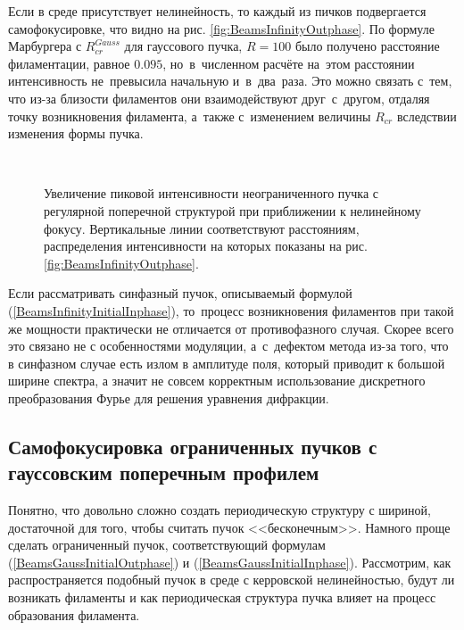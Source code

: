 
Если в среде присутствует нелинейность, то каждый из пичков подвергается самофокусировке, что видно на рис. \ref{fig:BeamsInfinityOutphase}.
По формуле Марбургера с $R_{cr}^{Gauss}$ для гауссового пучка, $R = 100$ было получено расстояние филаментации,
равное $0.095$, но~в~численном расчёте на~этом расстоянии интенсивность не~превысила начальную и~в~два~раза. 
Это можно связать с~тем, что из-за близости филаментов они взаимодействуют друг~с~другом, отдаляя точку возникновения филамента,
а~также с~изменением величины $R_{cr}$ вследствии изменения формы пучка.


\begin{figure}[H]
    \begin{center}
        \begin{minipage}{\minipagewidthtwo}
        \end{minipage}
       \\[1ex]
        \caption{Увеличение пиковой интенсивности неограниченного пучка с регулярной поперечной структурой при приближении к нелинейному фокусу.
                 Вертикальные линии соответствуют расстояниям, распределения интенсивности на которых показаны на рис.  \ref{fig:BeamsInfinityOutphase}.}
        \label{fig:BeamsInfinityIz}
    \end{center}
\end{figure}


Если рассматривать синфазный пучок, описываемый формулой (\ref{BeamsInfinityInitialInphase}), то~процесс возникновения
филаментов при такой же мощности практически не отличается от противофазного случая.
Скорее всего это связано не с особенностями модуляции, а~с~дефектом метода из-за того,
что в синфазном случае есть излом в амплитуде поля, который приводит к большой ширине спектра,
а значит не совсем корректным использование дискретного преобразования Фурье для решения уравнения дифракции.


\subsection{Самофокусировка ограниченных пучков с гауссовским поперечным профилем}

Понятно, что довольно сложно создать периодическую структуру с шириной, достаточной для того, чтобы считать пучок <<бесконечным>>.
Намного проще сделать ограниченный пучок, соответствующий формулам (\ref{BeamsGaussInitialOutphase}) и (\ref{BeamsGaussInitialInphase}).
Рассмотрим, как распространяется подобный пучок в среде с керровской нелинейностью,
будут ли возникать филаменты и как периодическая структура пучка влияет на процесс образования филамента.


